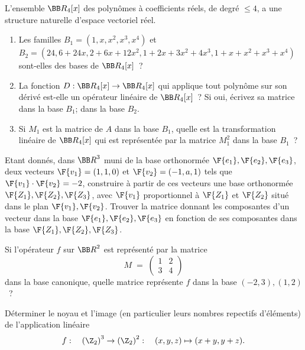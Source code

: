 \documentclass[12pt,french,oneside,a4paper]{memoir} %
\begin{document}
\begin{exo}
L'ensemble ${\BB R}_4[x]$ des polynômes à coefficients réels, de degré $\leq 4$, a une structure naturelle d'espace vectoriel réel. 
\begin{enumerate}
\item Les familles $B_1=(1,x,x^2,x^3,x^4)$ et $B_2=(24,6+24x,2+6x+12x^2, 
1+2x+3x^2+4x^3, 1+x+x^2+x^3+x^4)$ sont-elles des bases de ${\BB R}_4[x]$~?
\item La fonction $D : {\BB R}_4[x] \rightarrow {\BB R}_4[x]$ qui applique tout 
polynôme sur son dérivé est-elle un opérateur linéaire de ${\BB R}_4[x]$~? 
Si oui, écrivez sa matrice dans la base $B_1$; dans la base $B_2$. 
\item Si $M_1$ est la matrice de $A$ dans la base $B_1$, quelle est 
la transformation linéaire de ${\BB R}_4[x]$ qui est représentée par la 
matrice $M_1^2$ dans la base $B_1$~?
\end{enumerate}
\end{exo}
\begin{exo}
Etant donnés, dans ${\BB R}^3$ muni de la base orthonormée 
$\F{\mathstrut{e_1}}, \F{\mathstrut{e_2}}, \F{\mathstrut{e_3}}$, deux vecteurs $\F{\mathstrut{v_1}}=(1,1,0)$ et 
$\F{\mathstrut{v_2}}=(-1,a,1)$ tels que $\F{\mathstrut{v_1}} \cdot \F{\mathstrut{v_2}} = -2$, 
construire à partir de ces vecteurs une base orthonormée 
$\F{\mathstrut{Z_1}}, \F{\mathstrut{Z_2}}, \F{\mathstrut{Z_3}}$, avec $\F{\mathstrut{v_1}}$ proportionnel à 
$\F{\mathstrut{Z_1}}$ et $\F{\mathstrut{Z_2}}$ situé dans le plan $\F{\mathstrut{v_1}}, \F{\mathstrut{v_2}}$. 
Trouver la matrice donnant les composantes d'un vecteur dans la base 
$\F{\mathstrut{e_1}}, \F{\mathstrut{e_2}}, \F{\mathstrut{e_3}}$ en fonction de ses composantes dans la base 
$\F{\mathstrut{Z_1}}, \F{\mathstrut{Z_2}}, \F{\mathstrut{Z_3}}$.
\end{exo}
\begin{exo}
Si l'opérateur $f$ sur ${\BB R}^2$ est représenté par la matrice 
\begin{equation*}
M \;=\; \left( \begin{array}{cc}
1 &2 \\
3 &4
\end{array} \right)
\end{equation*}
dans la base canonique, quelle matrice représente $f$ dans la base $(-2,3), (1,2)$~?
\end{exo}
\begin{exo}
Déterminer le noyau et l'image (en particulier leurs nombres repectifs d'éléments) de l'application linéaire 
\begin{equation*}
f:\quad \left(\Z_2\right)^3 \to \left(\Z_2\right)^2:\quad (x,y,z) \mapsto (x+y,y+z).
\end{equation*}
\end{exo}
\end{document}
